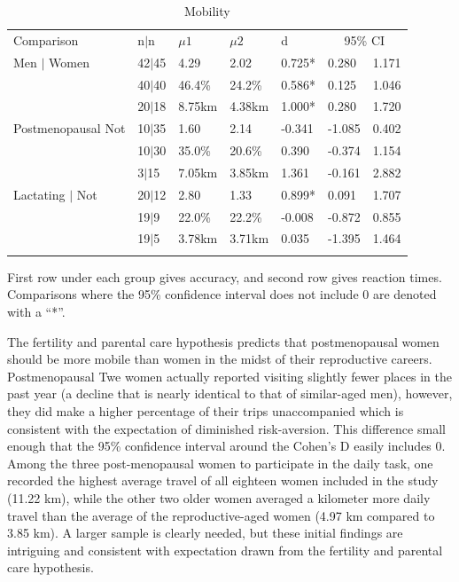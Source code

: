 \begin{table}[h!]
\caption{Mobility}
\label{tab:mob}  
\begin{tabular}{lllllll}
\hline\noalign{\smallskip}
Comparison & \phantom{0}n$|$n & $\mu1$ & $\mu2$ & d & \multicolumn{2}{c}{95\% CI} \\
\noalign{\smallskip}\hline\noalign{\smallskip}
Men $|$ Women & 42$|$45 & 4.29 & 2.02 & \phantom{-}0.725* & \phantom{-}0.280 & \phantom{-}1.171 \\
& 40$|$40 & 46.4\% & 24.2\% & \phantom{-}0.586* & \phantom{-}0.125 & \phantom{-}1.046 \\
& 20$|$18 & 8.75km & 4.38km & \phantom{-}1.000* & \phantom{-}0.280 & \phantom{-}1.720 \\
Postmenopausal Not & 10$|$35 & 1.60 & 2.14 & -0.341 & -1.085 & \phantom{-}0.402 \\
& 10$|$30 & 35.0\% & 20.6\% & \phantom{-}0.390 & -0.374 & \phantom{-}1.154 \\
& \phantom{0}3$|$15 & 7.05km & 3.85km & \phantom{-}1.361 & -0.161 & \phantom{-}2.882 \\
Lactating $|$ Not & 20$|$12 & 2.80 & 1.33 & \phantom{-}0.899* & \phantom{-}0.091 & \phantom{-}1.707 \\
& 19$|$9 & 22.0\% & 22.2\%  & -0.008 & -0.872 & \phantom{-}0.855 \\
& 19$|$5 & 3.78km & 3.71km & \phantom{-}0.035 & -1.395 & \phantom{-}1.464 \\
\noalign{\smallskip}\hline
\end{tabular}\par
\bigskip
First row under each group gives accuracy, and second row gives reaction times.  Comparisons where the 95\% confidence interval does not include 0 are denoted with a ``*''.
\end{table}		

The fertility and parental care hypothesis predicts that postmenopausal women should be more mobile than women in the midst of their reproductive careers.  Postmenopausal Twe women actually reported visiting slightly fewer places in the past year (a decline that is nearly identical to that of similar-aged men), however, they did make a higher percentage of their trips unaccompanied which is consistent with the expectation of diminished risk-aversion.  This difference small enough that the 95\% confidence interval around the Cohen's D easily includes 0.  Among the three post-menopausal women to participate in the daily task, one recorded the highest average travel of all eighteen women included in the study (11.22 km), while the other two older women averaged a kilometer more daily travel than the average of the reproductive-aged women (4.97 km compared to 3.85 km).  A larger sample is clearly needed, but these initial findings are intriguing and consistent with expectation drawn from the fertility and parental care hypothesis.

